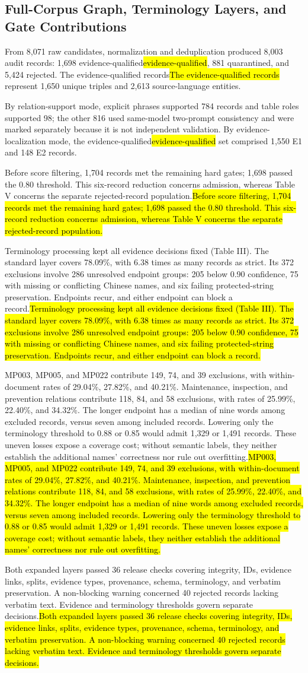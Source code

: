 \documentclass[conference,a4paper]{IEEEtran}
\DeclareRobustCommand{\rev}[1]{\ifdefined\CleanVersion#1\else\hl{#1}\fi}
\begin{document}
\subsection{Full-Corpus Graph, Terminology Layers, and Gate Contributions}

From 8,071 raw candidates, normalization and deduplication produced 8,003 audit records: 1,698 \rev{evidence-qualified}, 881 quarantined, and 5,424 rejected. \rev{The evidence-qualified records} represent 1,650 unique triples and 2,613 source-language entities.

By relation-support mode, explicit phrases supported 784 records and table roles supported 98; the other 816 used same-model two-prompt consistency and were marked separately because it is not independent validation. By evidence-localization mode, the \rev{evidence-qualified} set comprised 1,550 E1 and 148 E2 records.

\rev{Before score filtering, 1,704 records met the remaining hard gates; 1,698 passed the 0.80 threshold. This six-record reduction concerns admission, whereas Table V concerns the separate rejected-record population.}

\rev{Terminology processing kept all evidence decisions fixed (Table III). The standard layer covers 78.09\%, with 6.38 times as many records as strict. Its 372 exclusions involve 286 unresolved endpoint groups: 205 below 0.90 confidence, 75 with missing or conflicting Chinese names, and six failing protected-string preservation. Endpoints recur, and either endpoint can block a record.}

\rev{MP003, MP005, and MP022 contribute 149, 74, and 39 exclusions, with within-document rates of 29.04\%, 27.82\%, and 40.21\%. Maintenance, inspection, and prevention relations contribute 118, 84, and 58 exclusions, with rates of 25.99\%, 22.40\%, and 34.32\%. The longer endpoint has a median of nine words among excluded records, versus seven among included records. Lowering only the terminology threshold to 0.88 or 0.85 would admit 1,329 or 1,491 records. These uneven losses expose a coverage cost; without semantic labels, they neither establish the additional names' correctness nor rule out overfitting.}

\rev{Both expanded layers passed 36 release checks covering integrity, IDs, evidence links, splits, evidence types, provenance, schema, terminology, and verbatim preservation. A non-blocking warning concerned 40 rejected records lacking verbatim text. Evidence and terminology thresholds govern separate decisions.}
\end{document}
